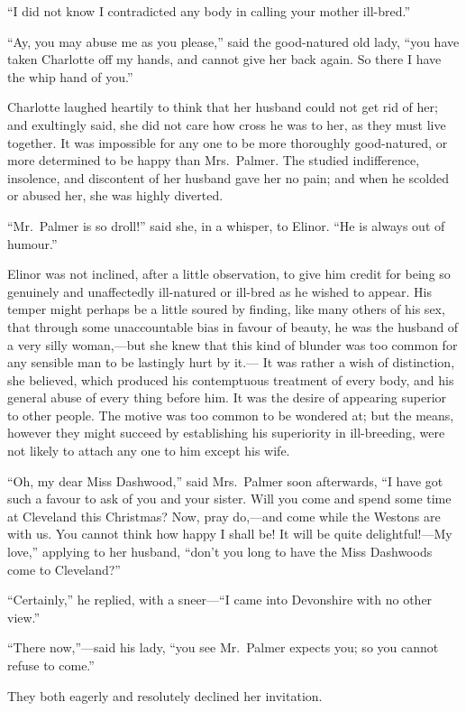 ``I did not know I contradicted any body in calling
your mother ill-bred.''

``Ay, you may abuse me as you please,'' said the good-natured
old lady, ``you have taken Charlotte off my hands, and cannot
give her back again.  So there I have the whip hand of you.''

Charlotte laughed heartily to think that her
husband could not get rid of her; and exultingly said,
she did not care how cross he was to her, as they must
live together.  It was impossible for any one to be more
thoroughly good-natured, or more determined to be happy
than Mrs.\ Palmer.  The studied indifference, insolence,
and discontent of her husband gave her no pain;
and when he scolded or abused her, she was highly diverted.

``Mr.\ Palmer is so droll!'' said she, in a whisper,
to Elinor.  ``He is always out of humour.''

Elinor was not inclined, after a little observation,
to give him credit for being so genuinely and unaffectedly
ill-natured or ill-bred as he wished to appear.
His temper might perhaps be a little soured by finding,
like many others of his sex, that through some unaccountable
bias in favour of beauty, he was the husband of a very silly
woman,---but she knew that this kind of blunder was too
common for any sensible man to be lastingly hurt by it.---%
It was rather a wish of distinction, she believed,
which produced his contemptuous treatment of every body,
and his general abuse of every thing before him.
It was the desire of appearing superior to other people.
The motive was too common to be wondered at; but the means,
however they might succeed by establishing his superiority
in ill-breeding, were not likely to attach any one to him
except his wife.

``Oh, my dear Miss Dashwood,'' said Mrs.\ Palmer soon afterwards,
``I have got such a favour to ask of you and your sister.
Will you come and spend some time at Cleveland this
Christmas?  Now, pray do,---and come while the Westons are
with us.  You cannot think how happy I shall be!  It will
be quite delightful!---My love,'' applying to her husband,
``don't you long to have the Miss Dashwoods come to Cleveland?''

``Certainly,'' he replied, with a sneer---``I came
into Devonshire with no other view.''

``There now,''---said his lady, ``you see Mr.\ Palmer
expects you; so you cannot refuse to come.''

They both eagerly and resolutely declined her invitation.

